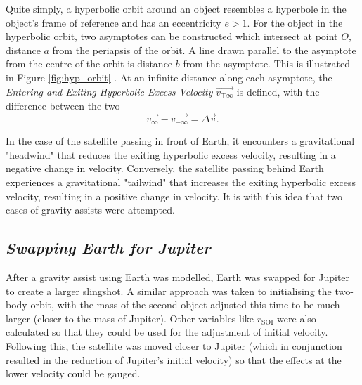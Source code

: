 \documentclass[12pt, english]{report}
\begin{document}
{Quite simply, a hyperbolic orbit around an object resembles a hyperbole in the object's frame of reference and has an eccentricity $e > 1$. For the object in the hyperbolic orbit, two asymptotes can be constructed which intersect at point $O$, distance $a$ from the periapsis of the orbit. A line drawn parallel to the asymptote from the centre of the orbit is distance $b$ from the asymptote. This is illustrated in Figure \ref{fig:hyp_orbit} . At an infinite distance along each asymptote, the \emph{Entering and Exiting Hyperbolic Excess Velocity} $\vec{v_{\mp \infty}}$ is defined, with the difference between the two
\begin{equation} 
    \vec{v_{\infty}} - \vec{v_{-\infty}} = \Delta \vec{v}.
\end{equation}
}

In the case of the satellite passing in front of Earth, it encounters a gravitational "headwind" that reduces the exiting hyperbolic excess velocity, resulting in a negative change in velocity. Conversely, the satellite passing behind Earth experiences a gravitational "tailwind" that increases the exiting hyperbolic excess velocity, resulting in a positive change in velocity. It is with this idea that two cases of gravity assists were attempted.

\subsection{\textsl{Swapping Earth for Jupiter}}
\normalsize{\noindent After a gravity assist using Earth was modelled, Earth was swapped for Jupiter to create a larger slingshot. A similar approach was taken to initialising the two-body orbit, with the mass of the second object adjusted this time to be much larger (closer to the mass of Jupiter). Other variables like $r_\mathrm{{SOI}}$ were also calculated so that they could be used for the adjustment of initial velocity.
Following this, the satellite was moved closer to Jupiter (which in conjunction resulted in the reduction of Jupiter's initial velocity) so that the effects at the lower velocity could be gauged.
}
\end{document}
